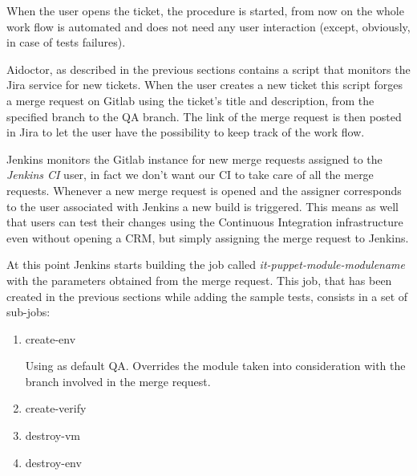 When the user opens the ticket, the procedure is started, from now on the
whole work flow is automated and does not need any user interaction
(except, obviously, in case of tests failures).

Aidoctor, as described in the previous sections contains a script that
monitors the Jira service for new tickets. When the user creates a new
ticket this script forges a merge request on Gitlab using the ticket's
title and description, from the specified branch to the QA branch. The
link of the merge request is then posted in Jira to let the user have the
possibility to keep track of the work flow.

Jenkins monitors the Gitlab instance for new merge requests assigned to
the \textit{Jenkins CI} user, in fact we don't want our CI to take care of
all the merge requests. Whenever a new merge request is opened and the
assigner corresponds to the user associated with Jenkins a new build is
triggered. This means as well that users can test their changes using the
Continuous Integration infrastructure even without opening a CRM, but
simply assigning the merge request to Jenkins.

At this point Jenkins starts building the job called
\textit{it-puppet-module-modulename} with the parameters obtained from the
merge request. This job, that has been created in the previous sections
while adding the sample tests, consists in a set of sub-jobs:

\begin{enumerate}

  \item create-env

  Using as default QA. Overrides the module taken into consideration with
  the branch involved in the merge request.

  \item create-verify

  \item destroy-vm

  \item destroy-env

\end{enumerate}




